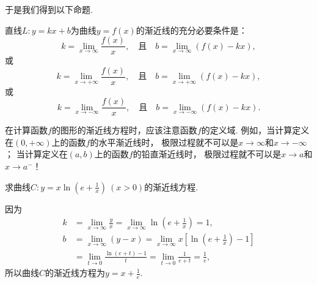 于是我们得到以下命题.
\begin{proposition}
直线\(L: y = kx+b\)为曲线\(y = f(x)\)的渐近线的充分必要条件是：\begin{equation*}
	k = \lim_{x\to\infty} \frac{f(x)}{x},
	\quad\text{且}\quad
	b = \lim_{x\to\infty} \left( f(x) - kx \right),
\end{equation*}
或\begin{equation*}
	k = \lim_{x\to+\infty} \frac{f(x)}{x},
	\quad\text{且}\quad
	b = \lim_{x\to+\infty} \left( f(x) - kx \right),
\end{equation*}
或\begin{equation*}
	k = \lim_{x\to-\infty} \frac{f(x)}{x},
	\quad\text{且}\quad
	b = \lim_{x\to-\infty} \left( f(x) - kx \right).
\end{equation*}
\end{proposition}

\begin{remark}
在计算函数\(f\)的图形的渐近线方程时，应该注意函数\(f\)的定义域.
例如，当计算定义在\((0,+\infty)\)上的函数\(f\)的水平渐近线时，
极限过程就不可以是\(x\to\infty\)和\(x\to-\infty\)；
当计算定义在\((a,b)\)上的函数\(f\)的铅直渐近线时，
极限过程就不可以是\(x \to a\)和\(x \to a^-\)！
\end{remark}


\begin{example}
求曲线\(C: y = x \ln(e+\frac1x)\ (x>0)\)的渐近线方程.
\begin{solution}
因为\begin{align*}
	k &= \lim_{x\to\infty} \frac{y}{x}
	= \lim_{x\to\infty} \ln(e+\frac1x)
	= 1, \\
	b &= \lim_{x\to\infty} (y-x)
	= \lim_{x\to\infty} x\left[ \ln(e+\frac1x) - 1 \right] \\
	&= \lim_{t\to0} \frac{\ln(e+t)-1}{t}
	= \lim_{t\to0} \frac1{e+t}
	= \frac1e,
\end{align*}
所以曲线\(C\)的渐近线方程为\(y = x + \frac1e\).
\end{solution}
\end{example}

